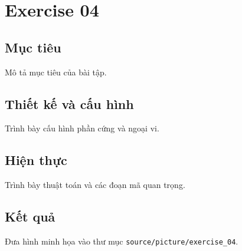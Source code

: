 \chapter{Exercise 04}
\section{Mục tiêu}
Mô tả mục tiêu của bài tập.
\section{Thiết kế và cấu hình}
Trình bày cấu hình phần cứng và ngoại vi.
\section{Hiện thực}
Trình bày thuật toán và các đoạn mã quan trọng.
\section{Kết quả}
Đưa hình minh họa vào thư mục \texttt{source/picture/exercise\_04}.
